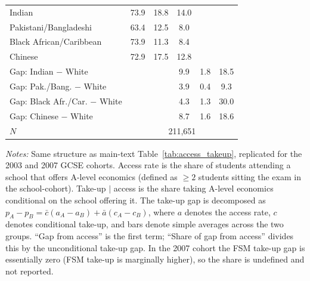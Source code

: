 \begin{table}[htbp]
\begin{tabular}{l ccccc}
Indian                        & 73.9         & 18.8         & 14.0         &            &            \\
Pakistani/Bangladeshi         & 63.4         & 12.5         & 8.0         &            &            \\
Black African/Caribbean       & 73.9         & 11.3         & 8.4         &            &            \\
Chinese                       & 72.9         & 17.5         & 12.8         &            &            \\
\addlinespace
Gap: Indian $-$ White         &            &            & 9.9         & 1.8         & 18.5         \\
Gap: Pak./Bang. $-$ White     &            &            & 3.9         & 0.4         & 9.3          \\
Gap: Black Afr./Car. $-$ White &            &            & 4.3         & 1.3         & 30.0         \\
Gap: Chinese $-$ White        &            &            & 8.7         & 1.6         & 18.6         \\
\addlinespace
$N$                           & \multicolumn{5}{c}{211,651} \\
\bottomrule
\end{tabular}

\begin{minipage}{\textwidth}
\smallskip
\footnotesize
\textit{Notes:} Same structure as main-text Table~\ref{tab:access_takeup}, replicated for the 2003 and 2007 GCSE cohorts. Access rate is the share of students attending a school that offers A-level economics (defined as $\geq 2$ students sitting the exam in the school-cohort). Take-up $|$ access is the share taking A-level economics conditional on the school offering it. The take-up gap is decomposed as $p_A - p_B = \bar{c}(a_A - a_B) + \bar{a}(c_A - c_B)$, where $a$ denotes the access rate, $c$ denotes conditional take-up, and bars denote simple averages across the two groups. ``Gap from access'' is the first term; ``Share of gap from access'' divides this by the unconditional take-up gap. In the 2007 cohort the FSM take-up gap is essentially zero (FSM take-up is marginally higher), so the share is undefined and not reported.
\end{minipage}
\end{table}
